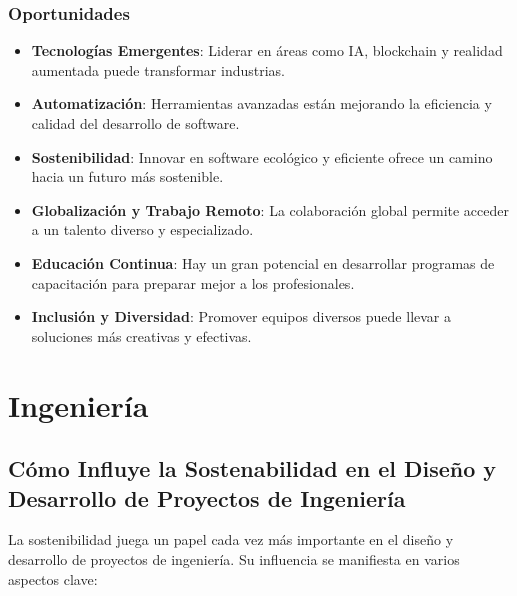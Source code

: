 \documentclass[11pt, a4paper]{article} %
\begin{document}
    \subsubsection{Oportunidades}

    \begin{itemize}
        \item \textbf{Tecnologías Emergentes}: Liderar en áreas como IA, blockchain y
            realidad aumentada puede transformar industrias.

        \item \textbf{Automatización}: Herramientas avanzadas están mejorando la eficiencia
            y calidad del desarrollo de software.

        \item \textbf{Sostenibilidad}: Innovar en software ecológico y eficiente ofrece un
            camino hacia un futuro más sostenible.

        \item \textbf{Globalización y Trabajo Remoto}: La colaboración global permite acceder
            a un talento diverso y especializado.

        \item \textbf{Educación Continua}: Hay un gran potencial en desarrollar programas de
            capacitación para preparar mejor a los profesionales.

        \item \textbf{Inclusión y Diversidad}: Promover equipos diversos puede llevar a soluciones
            más creativas y efectivas.
    \end{itemize}

    \section{Ingeniería}

    \subsection{ Cómo Influye la Sostenabilidad en el Diseño y Desarrollo de Proyectos de Ingeniería
    }

    La sostenibilidad juega un papel cada vez más importante en el diseño y desarrollo de
    proyectos de ingeniería. Su influencia se manifiesta en varios aspectos clave:
\end{document}
